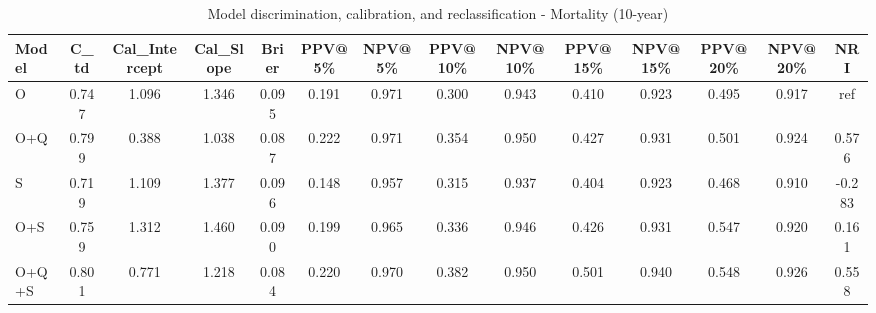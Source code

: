 \begin{table}[htbp]
\centering
\small
\caption{Model discrimination, calibration, and reclassification - Mortality (10-year)}
\label{tab:perf_mortality_10y}
\begin{tabular}{lccccccccccccc}
\toprule
Model & C\_td & Cal\_Intercept & Cal\_Slope & Brier & PPV@5\% & NPV@5\% & PPV@10\% & NPV@10\% & PPV@15\% & NPV@15\% & PPV@20\% & NPV@20\% & NRI \\
\midrule
O & 0.747 & 1.096 & 1.346 & 0.095 & 0.191 & 0.971 & 0.300 & 0.943 & 0.410 & 0.923 & 0.495 & 0.917 & ref \\
O+Q & 0.799 & 0.388 & 1.038 & 0.087 & 0.222 & 0.971 & 0.354 & 0.950 & 0.427 & 0.931 & 0.501 & 0.924 & 0.576 \\
S & 0.719 & 1.109 & 1.377 & 0.096 & 0.148 & 0.957 & 0.315 & 0.937 & 0.404 & 0.923 & 0.468 & 0.910 & -0.283 \\
O+S & 0.759 & 1.312 & 1.460 & 0.090 & 0.199 & 0.965 & 0.336 & 0.946 & 0.426 & 0.931 & 0.547 & 0.920 & 0.161 \\
O+Q+S & 0.801 & 0.771 & 1.218 & 0.084 & 0.220 & 0.970 & 0.382 & 0.950 & 0.501 & 0.940 & 0.548 & 0.926 & 0.558 \\
\bottomrule
\end{tabular}
\end{table}
